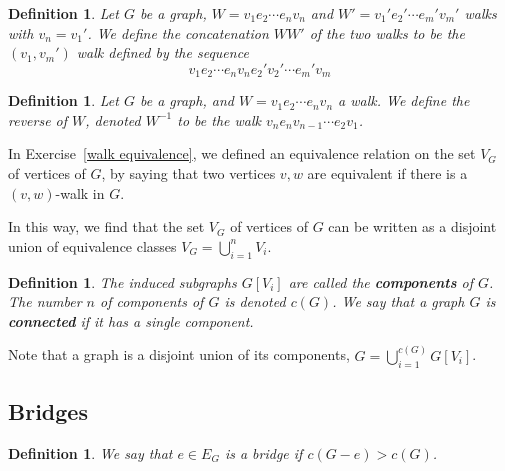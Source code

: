 \documentclass[12pt]{report}
\theoremstyle{plain}
\newtheorem{defn}[thm]{Definition}
\newcommand{\Xb}[1]{\textbf{#1}\index{#1}}
\begin{document}
\begin{defn}
Let $G$ be a graph, $W = v_1 e_2 \cdots e_n v_n$ and $W' = v_1' e_2' \cdots
e_m' v_m'$ walks with $v_n = v_1'$. We define the concatenation $WW'$ of
the two walks to be the $(v_1,v_m')$ walk defined by the sequence
\[v_1 e_2 \cdots e_n v_n e_2' v_2' \cdots e_m' v_m \]
\end{defn}

\begin{defn}
Let $G$ be a graph, and $W = v_1 e_2 \cdots e_n v_n$ a walk. We define the
reverse of $W$, denoted $W^{-1}$ to be the walk $v_n e_n v_{n-1} \cdots e_2
v_1$.
\end{defn}

In Exercise~\ref{walk equivalence}, we defined an equivalence relation on
the set $V_G$ of vertices of $G$, by saying that two vertices $v, w$ are
equivalent if there is a $(v,w)$-walk in $G$.

In this way, we find that the set $V_G$ of vertices of $G$ can be written
as a disjoint union of equivalence classes $V_G = \bigcup_{i = 1}^n V_i$.

\begin{defn}
The induced subgraphs $G[V_i]$ are called the \Xb{components} of $G$. The
number $n$ of components of $G$ is denoted $c(G)$. We say that a graph $G$
is \Xb{connected} if it has a single component.
\end{defn}

Note that a graph is a disjoint union of its components, $G = \bigcup_{i =
1}^{c(G)} G[V_i]$.

\subsection{Bridges}

\begin{defn}
We say that $e \in E_G$ is a bridge if $c(G - e) > c(G)$.
\end{defn}
\end{document}

